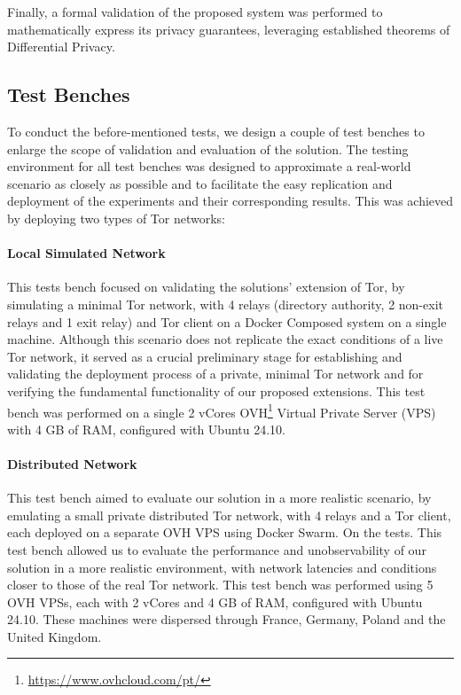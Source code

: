Finally, a formal validation of the proposed system was performed to mathematically express its privacy guarantees, leveraging established theorems of Differential Privacy.

\subsection{Test Benches}\label{sec:testbenches}

To conduct the before-mentioned tests, we design a couple of test benches to enlarge the scope of validation and evaluation of the solution. The testing environment for all test benches was designed to approximate a real-world scenario as closely as possible and to facilitate the easy replication and deployment of the experiments and their corresponding results. This was achieved by deploying two types of Tor networks:
\paragraph{Local Simulated Network} This tests bench focused on validating the solutions' extension of Tor, by simulating a minimal Tor network, with 4 relays (directory authority, 2 non-exit relays and 1 exit relay) and Tor client on a Docker Composed system on a single machine. Although this scenario does not replicate the exact conditions of a live Tor network, it served as a crucial preliminary stage for establishing and validating the deployment process of a private, minimal Tor network and for verifying the fundamental functionality of our proposed extensions. This test bench was performed on a single 2 vCores OVH\footnote{\url{https://www.ovhcloud.com/pt/}} Virtual Private Server (VPS) with 4 GB of RAM, configured with Ubuntu 24.10.
\paragraph{Distributed Network} This test bench aimed to evaluate our solution in a more realistic scenario, by emulating a small private distributed Tor network, with 4 relays and a Tor client, each deployed on a separate OVH VPS using Docker Swarm. On the tests. This test bench allowed us to evaluate the performance and unobservability of our solution in a more realistic environment, with network latencies and conditions closer to those of the real Tor network. This test bench was performed using 5 OVH VPSs, each with 2 vCores and 4 GB of RAM, configured with Ubuntu 24.10. These machines were dispersed through France, Germany, Poland and the United Kingdom.

